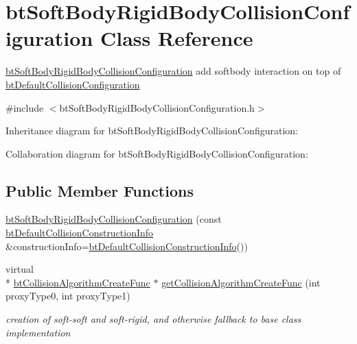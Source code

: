 \hypertarget{classbt_soft_body_rigid_body_collision_configuration}{\section{bt\+Soft\+Body\+Rigid\+Body\+Collision\+Configuration Class Reference}
\label{classbt_soft_body_rigid_body_collision_configuration}
}


\hyperlink{classbt_soft_body_rigid_body_collision_configuration}{bt\+Soft\+Body\+Rigid\+Body\+Collision\+Configuration} add softbody interaction on top of \hyperlink{classbt_default_collision_configuration}{bt\+Default\+Collision\+Configuration}  




{\ttfamily \#include $<$bt\+Soft\+Body\+Rigid\+Body\+Collision\+Configuration.\+h$>$}



Inheritance diagram for bt\+Soft\+Body\+Rigid\+Body\+Collision\+Configuration\+:


Collaboration diagram for bt\+Soft\+Body\+Rigid\+Body\+Collision\+Configuration\+:
\subsection*{Public Member Functions}
\begin{DoxyCompactItemize}
\item 
\hyperlink{classbt_soft_body_rigid_body_collision_configuration_aed032b3ffc351d036e28b503d3cdc801}{bt\+Soft\+Body\+Rigid\+Body\+Collision\+Configuration} (const \hyperlink{structbt_default_collision_construction_info}{bt\+Default\+Collision\+Construction\+Info} \&construction\+Info=\hyperlink{structbt_default_collision_construction_info}{bt\+Default\+Collision\+Construction\+Info}())
\item 
virtual \\*
\hyperlink{structbt_collision_algorithm_create_func}{bt\+Collision\+Algorithm\+Create\+Func} $\ast$ \hyperlink{classbt_soft_body_rigid_body_collision_configuration_a81be88bc433469b4703fc0fb9d504a50}{get\+Collision\+Algorithm\+Create\+Func} (int proxy\+Type0, int proxy\+Type1)
\begin{DoxyCompactList}\small\item\em creation of soft-\/soft and soft-\/rigid, and otherwise fallback to base class implementation \end{DoxyCompactList}\end{DoxyCompactItemize}
